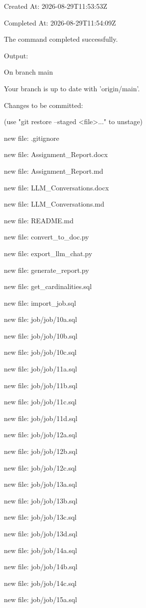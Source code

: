 \documentclass[11pt,a4paper]{article}
\begin{document}
{Created At: 2026-08-29T11:53:53Z

Completed At: 2026-08-29T11:54:09Z


The command completed successfully.

Output:

On branch main

Your branch is up to date with 'origin/main'.


Changes to be committed:

(use "git restore --staged <file>..." to unstage)

new file:   .gitignore

new file:   Assignment\_Report.docx

new file:   Assignment\_Report.md

new file:   LLM\_Conversations.docx

new file:   LLM\_Conversations.md

new file:   README.md

new file:   convert\_to\_doc.py

new file:   export\_llm\_chat.py

new file:   generate\_report.py

new file:   get\_cardinalities.sql

new file:   import\_job.sql

new file:   job/job/10a.sql

new file:   job/job/10b.sql

new file:   job/job/10c.sql

new file:   job/job/11a.sql

new file:   job/job/11b.sql

new file:   job/job/11c.sql

new file:   job/job/11d.sql

new file:   job/job/12a.sql

new file:   job/job/12b.sql

new file:   job/job/12c.sql

new file:   job/job/13a.sql

new file:   job/job/13b.sql

new file:   job/job/13c.sql

new file:   job/job/13d.sql

new file:   job/job/14a.sql

new file:   job/job/14b.sql

new file:   job/job/14c.sql

new file:   job/job/15a.sql

}
\end{document}

